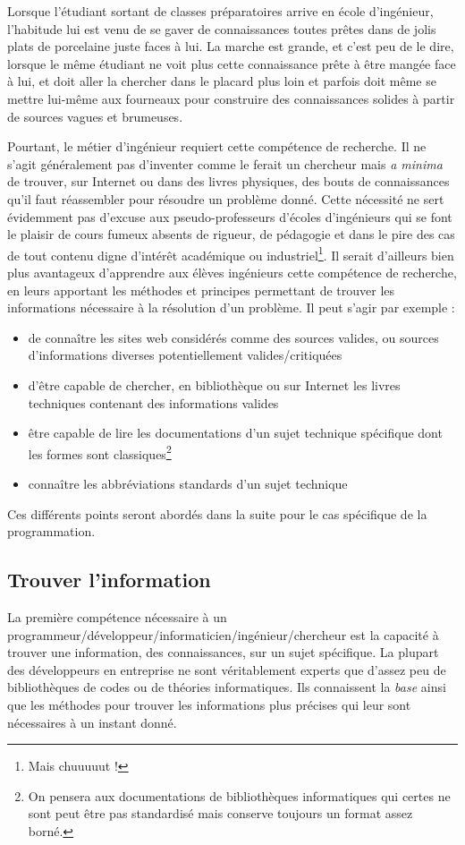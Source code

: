 \documentclass[../../../main.tex]{subfiles}
\begin{document}
Lorsque l'étudiant sortant de classes préparatoires arrive en école d'ingénieur, l'habitude lui est venu de se gaver de connaissances toutes prêtes dans de jolis plats de porcelaine juste faces à lui. La marche est grande, et c'est peu de le dire, lorsque le même étudiant ne voit plus cette connaissance prête à être mangée face à lui, et doit aller la chercher dans le placard plus loin et parfois doit même se mettre lui-même aux fourneaux pour construire des connaissances solides à partir de sources vagues et brumeuses.

Pourtant, le métier d'ingénieur requiert cette compétence de recherche. Il ne s'agit généralement pas d'inventer comme le ferait un chercheur mais \textit{a minima} de trouver, sur Internet ou dans des livres physiques, des bouts de connaissances qu'il faut réassembler pour résoudre un problème donné. Cette nécessité ne sert évidemment pas d'excuse aux pseudo-professeurs d'écoles d'ingénieurs qui se font le plaisir de cours fumeux absents de rigueur, de pédagogie et dans le pire des cas de tout contenu digne d'intérêt académique ou industriel\footnote{Mais chuuuuut !}. Il serait d'ailleurs bien plus avantageux d'apprendre aux élèves ingénieurs cette compétence de recherche, en leurs apportant les méthodes et principes permettant de trouver les informations nécessaire à la résolution d'un problème. Il peut s'agir par exemple :
\begin{itemize}
	\item de connaître les sites web considérés comme des sources valides, ou sources d'informations diverses potentiellement valides/critiquées
	\item d'être capable de chercher, en bibliothèque ou sur Internet les livres techniques contenant des informations valides
	\item être capable de lire les documentations d'un sujet technique spécifique dont les formes sont classiques\footnote{On pensera aux documentations de bibliothèques informatiques qui certes ne sont peut être pas standardisé mais conserve toujours un format assez borné.}
	\item connaître les abbréviations standards d'un sujet technique
\end{itemize}
Ces différents points seront abordés dans la suite pour le cas spécifique de la programmation.
\subsection{Trouver l'information}
La première compétence nécessaire à un programmeur/développeur/informaticien/ingénieur/chercheur est la capacité à trouver une information, des connaissances, sur un sujet spécifique. La plupart des développeurs en entreprise ne sont véritablement experts que d'assez peu de bibliothèques de codes ou de théories informatiques. Ils connaissent la \textit{base} ainsi que les méthodes pour trouver les informations plus précises qui leur sont nécessaires à un instant donné.
\end{document}
